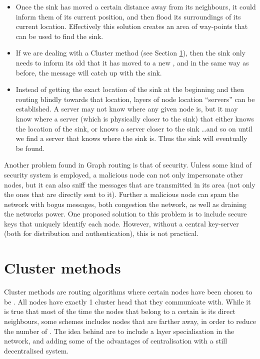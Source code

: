\documentclass[letter, 12pt, english, draft]{article}
\begin{document}
\begin{itemize}
\item Once the sink has moved a certain distance away from its neighbours, it could inform them of its current position, and then flood its surroundings of its current location. Effectively this solution creates an area of way-points that can be used to find the sink.
\item If we are dealing with a Cluster method (see Section \ref{cluster methods}), then the sink only needs to inform its old \ch that it has moved to a new \ch, and in the same way as before, the message will catch up with the sink.
\item Instead of getting the exact location of the sink at the beginning and then routing blindly towards that location, layers of node location ``servers'' can be established. A server may not know where any given node is, but it may know where a server (which is physically closer to the sink) that either knows the location of the sink, or knows a server closer to the sink \ldots and so on until we find a server that knows where the sink is. Thus the sink will eventually be found.
\end{itemize}

Another problem found in Graph routing is that of security. Unless some kind of security system is employed, a malicious node can not only impersonate other nodes, but it can also sniff the messages that are transmitted in its area (not only the ones that are directly sent to it). Further a malicious node can spam the network with bogus messages, both congestion the network, as well as draining the networks power. One proposed solution to this problem is to include secure keys that uniquely identify each node. However, without a central key-server (both for distribution and authentication), this is not practical.

\section{Cluster methods}
\label{cluster methods}
Cluster methods are routing algorithms where certain nodes have been chosen to be \ch. All nodes have exactly 1 cluster head that they communicate with. While it is true that most of the time the nodes that belong to a certain \ch is its direct neighbours, some schemes includes nodes that are farther away, in order to reduce the number of \ch. The idea behind \ch are to include a layer specialisation in the network, and adding some of the advantages of centralisation with a still decentralised system. 
\end{document}
